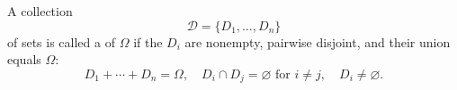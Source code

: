 A collection
$$\mathcal{D} = \{D_1, \ldots, D_n\}$$
of sets is called a  of $\Omega$ if the $D_i$ are nonempty, pairwise disjoint, and their union equals $\Omega$:
$$D_1 + \cdots + D_n = \Omega, \quad D_i \cap D_j = \varnothing \text{ for } i \neq j, \quad D_i \neq \varnothing.$$
